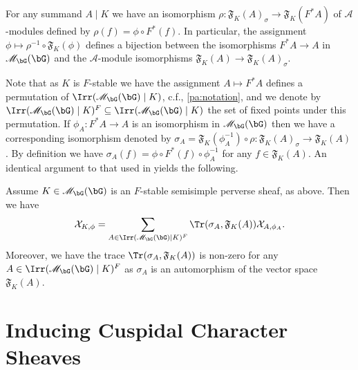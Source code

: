 \documentclass[eqthmnum,nocolour,skinny]{jt-calcs}
\begin{document}
\begin{lem}\label{lem:iso-correspondence}
For any summand $A \mid K$ we have an isomorphism $\rho : \mathfrak{F}_K(A)_{\sigma} \to \mathfrak{F}_K(F^*A)$ of $\mathcal{A}$-modules defined by $\rho(f) = \phi \circ F^*(f)$. In particular, the assignment $\phi \mapsto \rho^{-1}\circ\mathfrak{F}_K(\phi)$ defines a bijection between the isomorphisms $F^*A \to A$ in $\mathscr{M}_{\bG}(\bG)$ and the $\mathcal{A}$-module isomorphisms $\mathfrak{F}_K(A) \to \mathfrak{F}_K(A)_{\sigma}$.
\end{lem}

\begin{pa}\label{pa:iso-twisted-module}
Note that as $K$ is $F$-stable we have the assignment $A \mapsto F^*A$ defines a permutation of $\Irr(\mathscr{M}_{\bG}(\bG) \mid K)$, c.f., \cref{pa:notation}, and we denote by $\Irr(\mathscr{M}_{\bG}(\bG) \mid K)^F \subseteq \Irr(\mathscr{M}_{\bG}(\bG) \mid K)$ the set of fixed points under this permutation. If $\phi_A : F^*A \to A$ is an isomorphism in $\mathscr{M}_{\bG}(\bG)$ then we have a corresponding isomorphism denoted by $\sigma_A = \mathfrak{F}_K(\phi_A^{-1})\circ\rho : \mathfrak{F}_K(A)_{\sigma} \to \mathfrak{F}_K(A)$. By definition we have $\sigma_A(f) = \phi\circ F^*(f)\circ \phi_A^{-1}$ for any $f \in \mathfrak{F}_K(A)$. An identical argument to that used in \cite[10.4.2]{lusztig:1985:character-sheaves} yields the following.
\end{pa}

\begin{lem}\label{lem:char-func-semisimple}
Assume $K \in \mathscr{M}_{\bG}(\bG)$ is an $F$-stable semisimple perverse sheaf, as above. Then we have
\begin{equation*}
\mathcal{X}_{K,\phi} = \sum_{A \in \Irr(\mathscr{M}_{\bG}(\bG) \mid K)^F} \Tr(\sigma_A,\mathfrak{F}_K(A))\mathcal{X}_{A,\phi_A}.
\end{equation*}
Moreover, we have the trace $\Tr(\sigma_A,\mathfrak{F}_K(A))$ is non-zero for any $A \in \Irr(\mathscr{M}_{\bG}(\bG) \mid K)^F$ as $\sigma_A$ is an automorphism of the vector space $\mathfrak{F}_K(A)$.
\end{lem}

\section{Inducing Cuspidal Character Sheaves}\label{sec:ind-cusp-char-sheaves}
\end{document}

